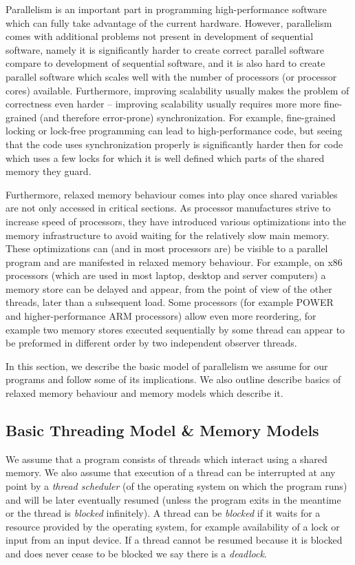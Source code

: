 Parallelism is an important part in programming high-performance software which
can fully take advantage of the current hardware.
However, parallelism comes with additional problems not present in development
of sequential software, namely it is significantly harder to create correct
parallel software compare to development of sequential software, and it is also
hard to create parallel software which scales well with the number of processors
(or processor cores) available.
Furthermore, improving scalability usually makes the problem of correctness even
harder -- improving scalability usually requires more more fine-grained (and
therefore error-prone) synchronization.
For example, fine-grained locking or lock-free programming can lead to
high-performance code, but seeing that the code uses synchronization properly
is significantly harder then for code which uses a few locks for which it is
well defined which parts of the shared memory they guard.

Furthermore, relaxed memory behaviour comes into play once shared variables are
not only accessed in critical sections.
As processor manufactures strive to increase speed of processors, they have
introduced various optimizations into the memory infrastructure to avoid
waiting for the relatively slow main memory.
These optimizations can (and in most processors are) be visible to a parallel
program and are manifested in relaxed memory behaviour.
For example, on x86 processors (which are used in most laptop, desktop and
server computers) a memory store can be delayed and appear, from the point of
view of the other threads, later than a subsequent load.
Some processors (for example POWER and higher-performance ARM processors) allow
even more reordering, for example two memory stores executed sequentially by
some thread can appear to be preformed in different order by two independent
observer threads.

In this section, we describe the basic model of parallelism we assume for our
programs and follow some of its implications.
We also outline describe basics of relaxed memory behaviour and memory models
which describe it.

\subsection{Basic Threading Model \& Memory Models}

We assume that a program consists of threads which interact using a shared
memory.
We also assume that execution of a thread can be interrupted at any point by a
\emph{thread scheduler} (of the operating system on which the program runs) and
will be later eventually resumed (unless the program exits in the meantime or
the thread is \emph{blocked} infinitely).
A thread can be \emph{blocked} if it waits for a resource provided by the
operating system, for example availability of a lock or input from an input
device.
If a thread cannot be resumed because it is blocked and does never cease to be
blocked we say there is a \emph{deadlock}.

